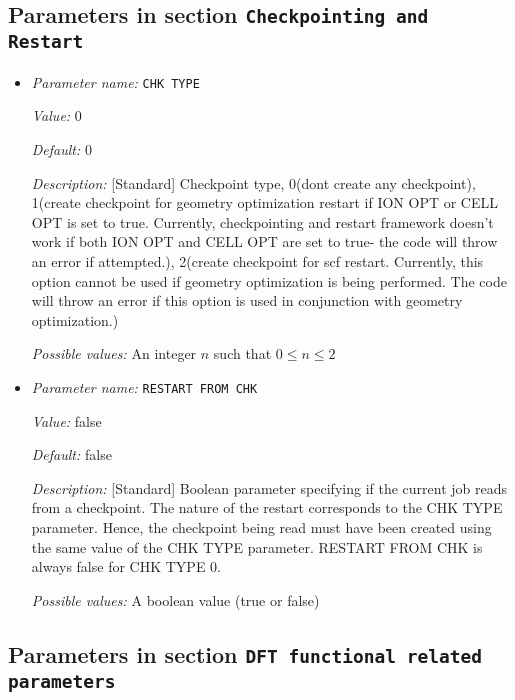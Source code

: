 \subsection{Parameters in section \tt Checkpointing and Restart}
\label{parameters:Checkpointing_20and_20Restart}

\begin{itemize}
\item {\it Parameter name:} {\tt CHK TYPE}
\label{parameters:Checkpointing and Restart/CHK TYPE}
\label{parameters:Checkpointing_20and_20Restart/CHK_20TYPE}


{\it Value:} 0


{\it Default:} 0


{\it Description:} [Standard] Checkpoint type, 0(dont create any checkpoint), 1(create checkpoint for geometry optimization restart if ION OPT or CELL OPT is set to true. Currently, checkpointing and restart framework doesn't work if both ION OPT and CELL OPT are set to true- the code will throw an error if attempted.), 2(create checkpoint for scf restart. Currently, this option cannot be used if geometry optimization is being performed. The code will throw an error if this option is used in conjunction with geometry optimization.)


{\it Possible values:} An integer $n$ such that $0\leq n \leq 2$
\item {\it Parameter name:} {\tt RESTART FROM CHK}
\label{parameters:Checkpointing and Restart/RESTART FROM CHK}
\label{parameters:Checkpointing_20and_20Restart/RESTART_20FROM_20CHK}


{\it Value:} false


{\it Default:} false


{\it Description:} [Standard] Boolean parameter specifying if the current job reads from a checkpoint. The nature of the restart corresponds to the CHK TYPE parameter. Hence, the checkpoint being read must have been created using the same value of the CHK TYPE parameter. RESTART FROM CHK is always false for CHK TYPE 0.


{\it Possible values:} A boolean value (true or false)
\end{itemize}

\subsection{Parameters in section \tt DFT functional related parameters}
\label{parameters:DFT_20functional_20related_20parameters}

